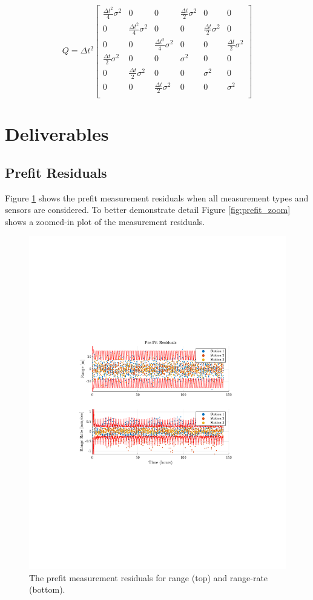 \documentclass[11pt]{article}
\begin{document}
\begin{equation}
\label{eq:Q}
Q = \Delta t^2 \begin{bmatrix}
\frac{\Delta t^2}{4} \sigma^2 & 0 & 0 & \frac{\Delta t}{2} \sigma^2 & 0 & 0 \\
0 & \frac{\Delta t^2}{4} \sigma^2 & 0 & 0 & \frac{\Delta t}{2} \sigma^2 & 0 \\
0 & 0 & \frac{\Delta t^2}{4} \sigma^2 & 0 & 0 & \frac{\Delta t}{2} \sigma^2 \\
\frac{\Delta t}{2} \sigma^2 & 0 & 0 & \sigma^2 & 0 & 0 \\
0 & \frac{\Delta t}{2} \sigma^2 & 0 & 0 & \sigma^2 & 0 \\
0 & 0 & \frac{\Delta t}{2} \sigma^2 & 0 & 0 & \sigma^2 \\	
\end{bmatrix}
\end{equation}

\section{Deliverables}

\subsection{Prefit Residuals}

Figure \ref{fig:prefit} shows the prefit measurement residuals when all measurement types and sensors are considered. To better demonstrate detail Figure \ref{fig:prefit_zoom} shows a zoomed-in plot of the measurement residuals.

\begin{figure}[!htb]
	\centering
	\includegraphics[clip,trim=4cm 8.5cm 4cm 8.5cm, width=.5\textwidth]{figs/prefit_res_final.pdf}
	\caption{The prefit measurement residuals for range (top) and range-rate (bottom).}
	\label{fig:prefit}
\end{figure}
\end{document}
